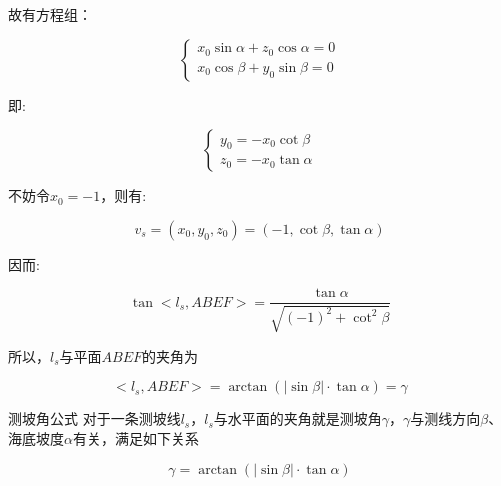故有方程组：

\begin{equation}
    \begin{cases}
        x_0\sin\alpha + z_0\cos\alpha = 0 \\
        x_0\cos\beta + y_0 \sin\beta = 0
    \end{cases}
\end{equation}

即:

\begin{equation*}
    \begin{cases}
        y_0 = -x_0 \cot \beta \\
        z_0 = -x_0 \tan \alpha
    \end{cases}
\end{equation*}

不妨令$x_0 = -1$，则有:

\begin{equation}
    v_s
    = (x_0, y_0, z_0)
    = \left(
    -1,
    \cot \beta,
    \tan \alpha
    \right)
\end{equation}

因而:

\begin{equation*}
    \tan <l_s, ABEF>
    = \frac {\tan \alpha} {\sqrt{(-1)^2 + \cot ^2 \beta}}
\end{equation*}

所以，$l_s$与平面$ABEF$的夹角为

\begin{equation}
    <l_s, ABEF>
    = \arctan \left(|\sin \beta| \cdot  \tan \alpha\right)
    = \gamma
\end{equation}

\begin{mcmTheorem}{测坡角公式}
    \label{theorem:测坡角公式}
    对于一条测坡线$l_s$，$l_s$与水平面的夹角就是测坡角$\gamma$，$\gamma$与测线方向$\beta$、海底坡度$\alpha$有关，满足如下关系

    \begin{equation}
        \gamma = \arctan(|\sin\beta| \cdot \tan\alpha)
    \end{equation}
\end{mcmTheorem}

